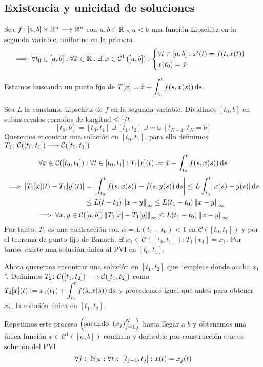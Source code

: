 \subsection{Existencia y unicidad de soluciones}
\begin{teo}
	Sea $f \colon [a,b]\times \mathbb{R}^n \longrightarrow \mathbb{R}^n$ con $a, b \in \mathbb{R} \; _{\wedge} \; a < b$ una función Lipschitz en la segunda variable, uniforme en la primera
	\[\implies \forall t_0\in [a,b] : \forall \hat{x} \in \mathbb{R} : \exists! \, x \in \mathcal{C}^1\left([a,b]\right) : \begin{cases}
			\forall t \in [a,b] : x'(t)=f(t, x(t)) \\
			x(t_0) = \hat{x}
		\end{cases}\]
	\begin{dem}
		Estamos buscando un punto fijo de $\ds T[x] = \hat{x} + \int_{t_0}^{t} f(s, x(s)) \odif{s}$.

		Sea $L$ la constante Lipschitz de $f$ en la segunda variable. Dividimos $[t_0, b]$ en subintervalos cerrados de longitud $< \sfrac{1}{L}$:
		\[[t_0, b] = [t_0, t_1] \cup [t_1, t_2] \cup \cdots \cup [t_{N-1}, t_N=b]\]
		Queremos encontrar una solución en $[t_0, t_1]$, para ello definimos $T_1 \colon \mathcal{C}([t_0, t_1]) \longrightarrow \mathcal{C}([t_0, t_1])$
		\[\forall x \in \mathcal{C}([t_0, t_1]) : \forall t \in [t_0, t_1] : T_1[x](t) \defeq \hat{x} + \int_{t_0}^{t} f(s, x(s)) \odif{s}\]
		\[\begin{aligned}
				\implies \abs{T_1[x](t) - T_1[y](t)} & = \abs{\int_{t_0}^{t} f(s, x(s)) - f(s, y(s)) \odif{s}} \leq L\int_{t_0}^{t} \abs{x(s)-y(s)} \odif{s} \\
				                                     & \leq L(t-t_0)\norm{x-y}_\infty \leq L(t_1-t_0)\norm{x-y}_\infty
			\end{aligned}\]
		\[\implies \forall x, y \in \mathcal{C}([a,b])  \left\Vert T_1[x]-T_1[y]\right\Vert_\infty \leq L(t_1-t_0)\left\Vert x-y\right\Vert_\infty\]
		Por tanto, $T_1$ es una contracción con $\alpha = L(t_1-t_0) < 1$ en $\mathcal{C}([t_0, t_1])$ y por el teorema de punto fijo de Banach, $\exists! \, x_1 \in \mathcal{C}([t_0, t_1]) : T_1[x_1]=x_1$. Por tanto, existe una solución única al PVI en $[t_0, t_1]$.

		Ahora queremos encontrar una solución en $[t_1, t_2]$ que ``empiece donde acaba $x_1$''. Definimos $T_2 \colon \mathcal{C}([t_1, t_2]) \longrightarrow \mathcal{C}([t_1, t_2])$ como $\ds T_2[x](t) \defeq x_1(t_1) + \int_{t_1}^{t} f(s, x(s)) \odif{s}$ y procedemos igual que antes para obtener $x_2$, la solución única en $[t_1, t_2]$.

		Repetimos este proceso $\left(\text{sacando }\left(x_j\right)_{j=1}^{N}\right)$ hasta llegar a $b$ y obtenemos una única función $x \in \mathcal{C}^1([a,b])$ continua y derivable por construcción que es solución del PVI.
		\[\forall j \in \mathbb{N}_N : \forall t \in [t_{j-1}, t_j] : x(t) = x_j(t)\]
	\end{dem}
\end{teo}

